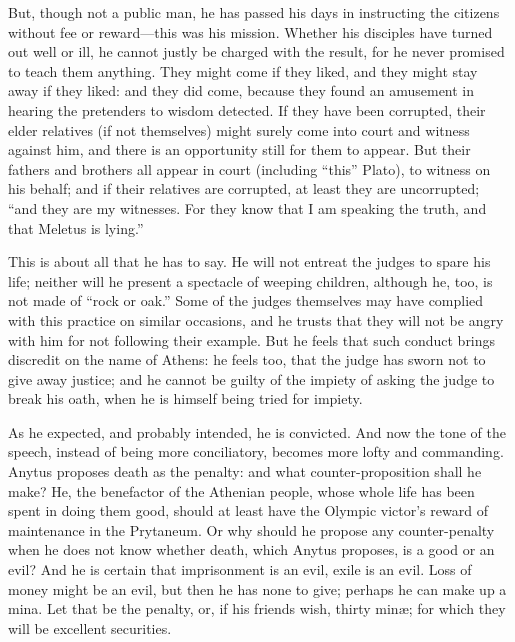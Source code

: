 \documentclass[11pt,letter]{article}
\begin{document}
\par  But, though not a public man, he has passed his days in instructing the citizens without fee or reward—this was his mission. Whether his disciples have turned out well or ill, he cannot justly be charged with the result, for he never promised to teach them anything. They might come if they liked, and they might stay away if they liked: and they did come, because they found an amusement in hearing the pretenders to wisdom detected. If they have been corrupted, their elder relatives (if not themselves) might surely come into court and witness against him, and there is an opportunity still for them to appear. But their fathers and brothers all appear in court (including “this” Plato), to witness on his behalf; and if their relatives are corrupted, at least they are uncorrupted; “and they are my witnesses. For they know that I am speaking the truth, and that Meletus is lying.”

\par  This is about all that he has to say. He will not entreat the judges to spare his life; neither will he present a spectacle of weeping children, although he, too, is not made of “rock or oak.” Some of the judges themselves may have complied with this practice on similar occasions, and he trusts that they will not be angry with him for not following their example. But he feels that such conduct brings discredit on the name of Athens: he feels too, that the judge has sworn not to give away justice; and he cannot be guilty of the impiety of asking the judge to break his oath, when he is himself being tried for impiety.

\par  As he expected, and probably intended, he is convicted. And now the tone of the speech, instead of being more conciliatory, becomes more lofty and commanding. Anytus proposes death as the penalty: and what counter-proposition shall he make? He, the benefactor of the Athenian people, whose whole life has been spent in doing them good, should at least have the Olympic victor’s reward of maintenance in the Prytaneum. Or why should he propose any counter-penalty when he does not know whether death, which Anytus proposes, is a good or an evil? And he is certain that imprisonment is an evil, exile is an evil. Loss of money might be an evil, but then he has none to give; perhaps he can make up a mina. Let that be the penalty, or, if his friends wish, thirty minæ; for which they will be excellent securities.

\par  [He is condemned to death.]
\end{document}
